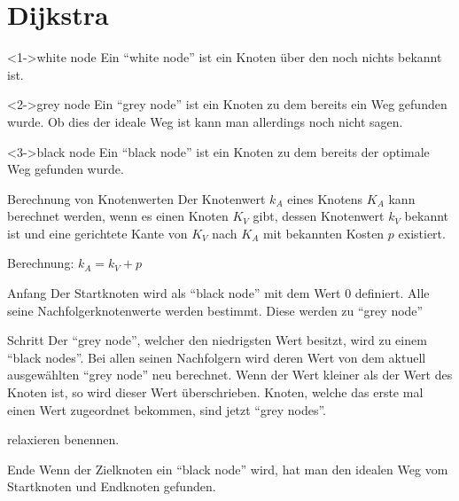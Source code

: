 \section{Dijkstra}


\begin{frame}
	\begin{block}<1->{white node}
		Ein ``white node'' ist ein Knoten über den noch nichts bekannt ist.
	\end{block}
	\begin{block}<2->{grey node}
		Ein ``grey node'' ist ein Knoten zu dem bereits ein Weg gefunden wurde. Ob dies der ideale Weg ist kann man allerdings noch nicht sagen.
	\end{block}
	\begin{block}<3->{black node}
		Ein ``black node'' ist ein Knoten zu dem bereits der optimale Weg gefunden wurde.
	\end{block}
\end{frame}

\begin{frame}
	\begin{block}{Berechnung von Knotenwerten}
		Der Knotenwert $k_A$ eines Knotens $K_A$ kann berechnet werden, wenn es einen Knoten $K_V$ gibt, dessen Knotenwert $k_V$ bekannt ist und eine gerichtete Kante von $K_V$ nach $K_A$ mit bekannten Kosten $p$ existiert.
	\end{block}
	\vfill
	Berechnung: $k_A = k_V + p$
\end{frame}

\begin{frame}
	\begin{block}{Anfang}
		Der Startknoten wird als ``black node'' mit dem Wert 0 definiert. 
		Alle seine Nachfolgerknotenwerte werden bestimmt. Diese werden zu ``grey node''
	\end{block}
\end{frame}
\begin{frame}
	\begin{block}{Schritt}
		Der ``grey node'', welcher den niedrigsten Wert besitzt, wird zu einem ``black nodes''.
		Bei allen seinen Nachfolgern wird deren Wert von dem aktuell ausgewählten ``grey node'' neu berechnet. Wenn der Wert kleiner als der Wert des Knoten ist, so wird dieser Wert überschrieben.
		Knoten, welche das erste mal einen Wert zugeordnet bekommen, sind jetzt ``grey nodes''.

		relaxieren benennen.
	\end{block}
\end{frame}
\begin{frame}
	\begin{block}{Ende}
		Wenn der Zielknoten ein ``black node'' wird, hat man den idealen Weg vom Startknoten und Endknoten gefunden.
	\end{block}

\end{frame}